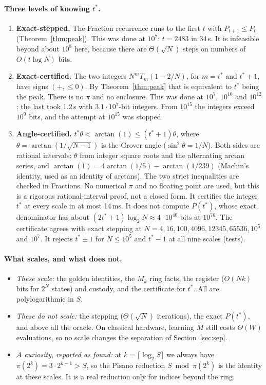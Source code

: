 \documentclass[11pt]{article}
\theoremstyle{definition}
\begin{document}
\paragraph{Three levels of knowing $t^*$.}
\begin{enumerate}
\item \textbf{Exact-stepped.} The Fraction recurrence runs to the first $t$ with $P_{t+1}\le P_t$
(Theorem~\ref{thm:peak}). This was done at $10^7$: $t=2483$ in 34\,s. It is infeasible beyond about $10^8$ here,
because there are $\Theta(\sqrt N)$ steps on numbers of $O(t\log N)$ bits.
\item \textbf{Exact-certified.} The two integers $N^mT_m(1-2/N)$, for $m=t^*$ and $t^*+1$, have signs $(+,\le0)$. By
Theorem~\ref{thm:peak} that is equivalent to $t^*$ being the peak. There is no $\pi$ and no enclosure. This was done
at $10^7$, $10^{10}$ and $10^{12}$; the last took 1.2\,s with $3.1\cdot10^7$-bit integers. From $10^{15}$ the integers
exceed $10^9$ bits, and the attempt at $10^{15}$ was stopped.
\item \textbf{Angle-certified.} $t^*\theta<\arctan(1)\le(t^*+1)\theta$, where $\theta=\arctan(1/\sqrt{N-1})$ is the
Grover angle ($\sin^2\theta=1/N$). Both sides are rational intervals: $\theta$ from integer square roots and the
alternating arctan series, and $\arctan(1)=4\arctan(1/5)-\arctan(1/239)$ (Machin's identity, used as an identity of
arctans). The two strict inequalities are checked in Fractions. No numerical $\pi$ and no floating point are used,
but this is a rigorous rational-interval proof, not a closed form. It certifies the integer $t^*$ at every scale in
at most 14\,ms. It does not compute $P(t^*)$, whose exact denominator has about $(2t^*+1)\log_2N\approx4\cdot10^{40}$
bits at $10^{76}$. The certificate agrees with exact stepping at $N=4,16,100,4096,12345,65536,10^5$ and $10^7$. It
rejects $t^*\pm1$ for $N\le10^5$ and $t^*-1$ at all nine scales (tests).
\end{enumerate}

\paragraph{What scales, and what does not.}
\begin{itemize}
\item \emph{These scale:} the golden identities, the $M_k$ ring facts, the register ($O(Nk)$ bits for $2^N$ states)
and custody, and the certificate for $t^*$. All are polylogarithmic in $S$.
\item \emph{These do not scale:} the stepping ($\Theta(\sqrt N)$ iterations), the exact $P(t^*)$, and above all the
oracle. On classical hardware, learning $M$ still costs $\Theta(W)$ evaluations, so no scale changes the separation of
Section~\ref{sec:sep}.
\item \emph{A curiosity, reported as found:} at $k=\lceil\log_2S\rceil$ we always have $\pi(2^k)=3\cdot2^{k-1}>S$, so
the Pisano reduction $S\bmod\pi(2^k)$ is the identity at these scales. It is a real reduction only for indices beyond
the ring.
\end{itemize}
\end{document}

